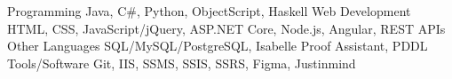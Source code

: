 \begin{cvskills}
  \cvskill
    {Programming} %
    {Java, C\#, Python, ObjectScript, Haskell} %
  \cvskill
    {Web Development} %
    {HTML, CSS, JavaScript/jQuery, ASP.NET Core, Node.js, Angular, REST APIs}
  \cvskill
    {Other Languages} %
    {SQL/MySQL/PostgreSQL, Isabelle Proof Assistant, PDDL}
  \cvskill
    {Tools/Software} %
    {Git, IIS, SSMS, SSIS, SSRS, Figma, Justinmind}
\end{cvskills}

